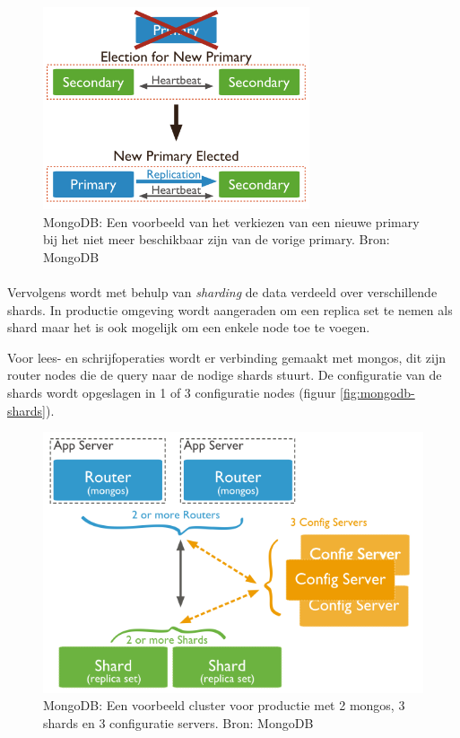 \begin{figure}[!htb]
	    \centering
    \includegraphics[width=0.7\textwidth]{img/mongodb-replica-set-trigger-election.png}
    \caption{MongoDB: Een voorbeeld van het verkiezen van een nieuwe primary bij het niet meer beschikbaar zijn van de vorige primary.  Bron: MongoDB\cite{mongodb-replicaset}}
    \label{fig:mongodb-replicaset-vote}
\end{figure}

\paragraph{} Vervolgens wordt met behulp van \textit{sharding} de data verdeeld over verschillende shards. In productie omgeving wordt aangeraden om een replica set te nemen als shard maar het is ook mogelijk om een enkele node toe te voegen. 

Voor lees- en schrijfoperaties wordt er verbinding gemaakt met mongos, dit zijn router nodes die de query naar de nodige shards stuurt. De configuratie van de shards wordt opgeslagen in 1 of 3 configuratie nodes (figuur \ref{fig:mongodb-shards}). 

\begin{figure}[!htb]
	    \centering
    \includegraphics[width=\textwidth]{img/mongo-sharded-cluster-production-architecture.png}
    \caption{MongoDB: Een voorbeeld cluster voor productie met 2 mongos, 3 shards en 3 configuratie servers. Bron: MongoDB\cite{mongodb-shard}}
    \label{MongoDB: Een voorbeeld cluster voor productie met 2 mongos, 3 shards en 3 configuratie servers. Bron: MongoDB\cite{mongodb-shard}}
\end{figure}

